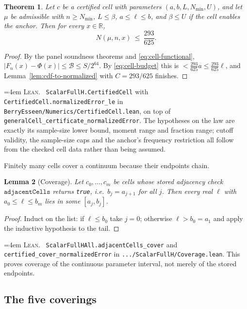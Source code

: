 \documentclass[10pt,a4paper]{article}
\theoremstyle{plain}
\newtheorem{theorem}{Theorem}[section]
\newtheorem{lemma}[theorem]{Lemma}
\theoremstyle{definition}
\newcommand{\R}{\mathbb{R}}
\newcommand{\lean}[1]{\texttt{#1}}
\newcommand{\file}[1]{\texttt{#1}}
\newenvironment{leanref}%
  {\par\addvspace{3pt}\begingroup\sloppy\emergencystretch=4em
   \noindent\footnotesize\textsc{Lean.}\ \ignorespaces}%
  {\par\endgroup\addvspace{3pt}}
\begin{document}
\begin{theorem}\label{thm:cell-sound}
Let $c$ be a certified cell with parameters $(a,b,L,N_{\min},U)$, and let $\mu$
be admissible with $n\ge N_{\min}$, $L\le\beta$, $a\le\ell\le b$, and
$\beta\le U$ if the cell enables the anchor. Then for every $x\in\R$,
\[
  N(\mu,n,x) \ \le\ \frac{293}{625}.
\]
\end{theorem}

\begin{proof}
By the panel soundness theorems and \eqref{eq:cell-functional},
$|F_n(x)-\Phi(x)|\le\mathcal B\le S/2^{64}$. By \eqref{eq:cell-budget} this is
$<\tfrac{293}{625}a\le\tfrac{293}{625}\ell$, and
Lemma~\ref{lem:cdf-to-normalized} with $C=293/625$ finishes.
\end{proof}

\begin{leanref}
\lean{ScalarFullH.CertifiedCell} with
\lean{CertifiedCell.normalizedError\_le} in
\file{BerryEsseen/Numerics/CertifiedCell.lean}, on top of
\lean{generalCell\_certificate\_normalizedError}. The hypotheses on the law are
exactly its sample-size lower bound, moment range and fraction range; cutoff
validity, the sample-size caps and the anchor's frequency restriction all follow
from the checked cell data rather than being assumed.
\end{leanref}

Finitely many cells cover a continuum because their endpoints chain.

\begin{lemma}[Coverage]\label{lem:coverage}
Let $c_0,\dots,c_{m}$ be cells whose stored adjacency check
$\lean{adjacentCells}$ returns \lean{true}, i.e.\ $b_{j}=a_{j+1}$ for all $j$.
Then every real $\ell$ with $a_0\le\ell\le b_m$ lies in some $[a_j,b_j]$.
\end{lemma}

\begin{proof}
Induct on the list: if $\ell\le b_0$ take $j=0$; otherwise $\ell>b_0=a_1$ and
apply the inductive hypothesis to the tail.
\end{proof}

\begin{leanref}
\lean{ScalarFullHAll.adjacentCells\_cover} and
\lean{certified\_cover\_normalizedError} in
\file{.../ScalarFullH/Coverage.lean}. This proves coverage
of the continuous parameter interval, not merely of the stored endpoints.
\end{leanref}

\subsection{The five coverings}
\end{document}
